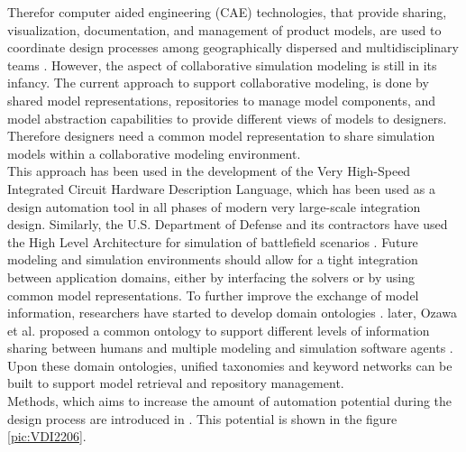 Therefor computer aided engineering (CAE) technologies, that provide sharing, visualization, 
documentation, and management of product models,
are used to coordinate design processes among geographically dispersed and multidisciplinary
teams \cite{finger_creating_1994, bajaj_web_1999, iwasaki_web-based_2002}.
However, the aspect of collaborative simulation modeling is still in its infancy. 
The current approach to support collaborative modeling, is done by shared model representations, 
repositories to manage model components, and model abstraction capabilities to provide different views of models to designers.
Therefore designers need a common model representation to share simulation models within a collaborative modeling environment.\cite{sinha_modeling_2001}\\
This approach has been used in the development of the Very High-Speed Integrated Circuit Hardware Description Language,
which has been used as a design automation tool in all phases of modern very large-scale integration design. 
Similarly, the U.S. Department of Defense and its contractors have used the High Level Architecture for simulation of
battlefield scenarios \cite{lutz_high_1998,park_relational_1994}.
Future modeling and simulation environments should allow for a tight integration
between application domains, either by interfacing the solvers or by using common model representations.
To further improve the exchange of model information, researchers have started to develop domain ontologies \cite{devedzic_survey_1999}. 
later, Ozawa et al. proposed a common ontology to support different levels of information sharing between humans and multiple
modeling and simulation software agents \cite{ozawa_model_2000}. 
Upon these domain ontologies, unified taxonomies and keyword networks
can be built to support model retrieval and repository management.\\
Methods, which aims to increase the amount of automation potential during the design process
are introduced in \cite{Herrmann2021, Berschik2021, Altun2021, Russwurm2021}.
This potential is shown in the figure \ref{pic:VDI2206}.
